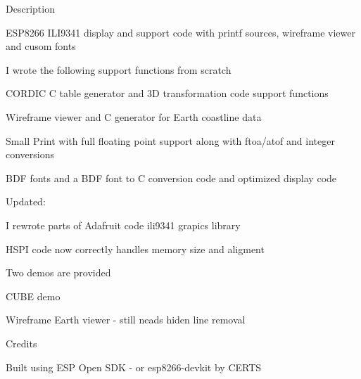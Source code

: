 \begin{DoxyParagraph}{Description}

\begin{DoxyItemize}
\item E\-S\-P8266 I\-L\-I9341 display and support code with printf sources, wireframe viewer and cusom fonts
\item I wrote the following support functions from scratch
\begin{DoxyItemize}
\item C\-O\-R\-D\-I\-C C table generator and 3\-D transformation code support functions
\item Wireframe viewer and C generator for Earth coastline data
\item Small Print with full floating point support along with ftoa/atof and integer conversions
\item B\-D\-F fonts and a B\-D\-F font to C conversion code and optimized display code
\end{DoxyItemize}
\item Updated\-:
\begin{DoxyItemize}
\item I rewrote parts of Adafruit code ili9341 grapics library
\item H\-S\-P\-I code now correctly handles memory size and aligment
\end{DoxyItemize}
\item Two demos are provided
\begin{DoxyItemize}
\item C\-U\-B\-E demo
\item Wireframe Earth viewer -\/ still neads hiden line removal 


\end{DoxyItemize}
\end{DoxyItemize}
\end{DoxyParagraph}
\begin{DoxyParagraph}{Credits}

\begin{DoxyItemize}
\item Built using E\-S\-P Open S\-D\-K -\/ or esp8266-\/devkit by C\-E\-R\-T\-S 
\end{DoxyItemize}
\end{DoxyParagraph}
